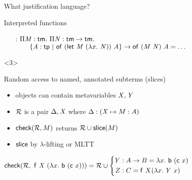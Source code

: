 \documentclass{beamer}
\theoremstyle{example}
\begin{document}
\begin{frame}{What justification language?}
\begin{overlayarea}
\begin{onlyenv}
\begin{block}{Interpreted functions}
\begin{example}
\begin{enumerate}[inline]
          \item[\const{inline} :] $\Pi{\ensuremath{\text{\textit{M}}}}:{\text{\textsf{tm}}}.\  \Pi{\ensuremath{\text{\textit{N}}}}:{\text{\textsf{tm}}\to\text{\textsf{tm}}}.\  $\\ $\qquad \{{\text{\textit{A}}}:{\text{\textsf{tp}}}\ |\ {{\text{\textsf{of}}}\  {(\text{\textsf{let}}\ {\text{\textit{M}}}\ {(\lambda{x}.\  \text{\textit{N}})})}\  {\text{\textit{A}}}}\} \to
            {\ensuremath{\text{\textsf{of}}}}\  {({\text{\textit{M}}}\  {\text{\textit{N}}})}\  {\text{\textit{A}}} =
            \ldots$
          \end{enumerate}
        \end{example}
      \end{block}
    \end{onlyenv}
    \begin{onlyenv}<3>
      \begin{block}
        {Random access} to named, annotated subterms (slices) \\
        \begin{itemize}
        \item objects can contain metavariables $\text{\textit{X}}, \text{\textit{Y}}$
        \item $\mathcal{R}$ is a pair $\Delta, \text{\textit{X}}$ where $\Delta :
          (\text{\textit{X}}\mapsto M : A)$
        \item ${\rm\mathsf{check}}({\mathcal{R}, M})$ returns $\mathcal{R} \cup {\rm\mathsf{slice}}({M})$
        \item ${\rm\mathsf{slice}}$ by $\lambda$-lifting or MLTT
        \end{itemize}
        \begin{example}
          \begin{math}
            {\rm\mathsf{check}}({\mathcal{R},\ \text{\textsf{f}}\ \text{\textit{X}}\ (\lambda{x}.\  \text{\textsf{b}}\ (\text{\textsf{c}}\ x))}) = \mathcal{R} \cup \left\{
              \begin{aligned}
                Y &: A\to B = \lambda{x}.\  \text{\textsf{b}}\ (\text{\textsf{c}}\ x) \\
                Z &: C = \text{\textsf{f}}\ X (\lambda{x}.\  Y\ x)
              \end{aligned}
            \right.
          \end{math}
        \end{example}
      \end{block}
      \end{onlyenv}
    \end{overlayarea}

\end{frame}
\end{document}
